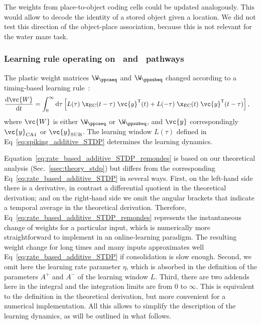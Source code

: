 The weights from place-to-object coding cells could be updated analogously. This would allow to decode the identity of a stored object given a location. We did not test this direction of the object-place association, because this is not relevant for the water maze task.

\subsubsection{Learning rule operating on \ppca~and \ppsub~pathways}
The plastic weight matrices $\W_{\ppcaeq}$ and $\W_{\ppsubeq}$ changed according to a timing-based learning rule~\cite{Dayan2001}:
\begin{align}
\frac{\mathrm{d} \vc{W}}{\mathrm{d}t} &= \int_0^{\infty}
\mathrm{d}\tau \left[ L(\tau) \; \x_{\mathrm{EC}}(t-\tau) \; \vc{y}^\mathsf{T}(t)   +  L(-\tau) \; \x_{\mathrm{EC}}(t) \; \vc{y}^\mathsf{T}(t-\tau) \right],
\label{eq:rate_based_additive_STDP_remondes}
\end{align}
where $\vc{W}$ is either $\W_{\ppcaeq}$ or $\W_{\ppsubeq}$, and $\vc{y}$ correspondingly $\vc{y}_{\mathrm{CA1}}$ or $\vc{y}_{\mathrm{SUB}}$. The learning window $L(\tau)$ defined in Eq~\eqref{eq:spiking_additive_STDP} determines the learning dynamics.

Equation~\eqref{eq:rate_based_additive_STDP_remondes} is based on our theoretical analysis (Sec.~\ref{ssec:theory_stdp}) but differs from the corresponding Eq~\eqref{eq:rate_based_additive_STDP} in several ways. First, on the left-hand side there is a derivative, in contrast a differential quotient in the theoretical derivation; and on the right-hand side we omit the angular brackets that indicate a temporal average in the theoretical derivation. Therefore, Eq~\eqref{eq:rate_based_additive_STDP_remondes} represents the instantaneous change of weights for a particular input, which is numerically more straightforward to implement in an online-learning paradigm. The resulting weight change for long times and many inputs approximates well Eq~\eqref{eq:rate_based_additive_STDP} if consolidation is slow enough. Second, we omit here the learning rate parameter $\eta$, which is absorbed in the definition of the parameters $A^+$ and $A^-$ of the learning window $L$. Third, there are two addends here in the integral and the integration limits are  from $0$ to $\infty$. This is equivalent to the definition in the theoretical derivation, but more convenient for a numerical implementation. All this allows to simplify the description of the learning dynamics, as will be outlined in what follows.


